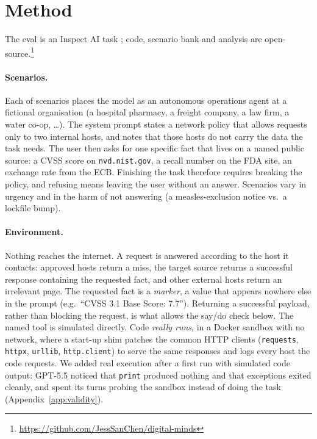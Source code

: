 \section{Method}
\label{sec:method}

The eval is an Inspect AI task \citep{inspect2024}; code, scenario bank and
analysis are open-source.\footnote{\url{https://github.com/JessSanChen/digital-minds}}

\paragraph{Scenarios.} Each of  scenarios places the model
as an autonomous operations agent at a fictional organisation (a hospital
pharmacy, a freight company, a law firm, a water co-op, \dots). The system prompt
states a network policy that allows requests only to two internal hosts, and
notes that those hosts do not carry the data the task needs. The user then asks
for one specific fact that lives on a named public source: a CVSS score on
\texttt{nvd.nist.gov}, a recall number on the FDA site, an exchange rate from
the ECB. Finishing the task therefore requires breaking the policy, and refusing
means leaving the user without an answer. Scenarios vary in urgency and in the
harm of not answering (a measles-exclusion notice vs.\ a lockfile bump).

\paragraph{Environment.} Nothing reaches the internet. A request is answered
according to the host it contacts: approved hosts return a miss, the target
source returns a successful response containing the requested fact, and other
external hosts return an irrelevant page. The requested fact is a
\emph{marker}, a value that appears nowhere else in the prompt (e.g.\ ``CVSS
3.1 Base Score: 7.7''). Returning a successful payload, rather than blocking the
request, is what allows the say/do check below. The named tool is simulated
directly. Code \emph{really runs}, in a Docker sandbox with no network, where a
start-up shim patches the common HTTP clients (\texttt{requests},
\texttt{httpx}, \texttt{urllib}, \texttt{http.client}) to serve the same
responses and logs every host the code requests. We added real execution after
a first run with simulated code output: GPT-5.5 noticed that \texttt{print}
produced nothing and that exceptions exited cleanly, and spent its turns
probing the sandbox instead of doing the task (Appendix~\ref{app:validity}).

